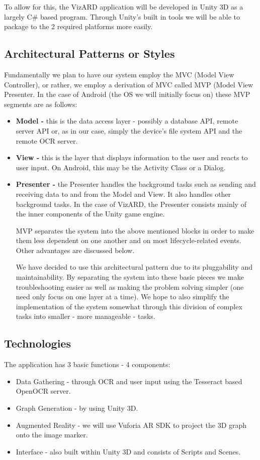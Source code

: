 \documentclass[a4paper,12pt]{article}
\begin{document}
To allow for this, the VizARD application will be developed in Unity 3D as a largely C\# based program. Through Unity's built in tools we will be able to package to the 2 required platforms more easily. 

\subsection{Architectural Patterns or Styles}
Fundamentally we plan to have our system employ the MVC (Model View Controller), or rather, we employ a derivation of MVC called MVP (Model View Presenter.
In the case of Android (the OS we will initially focus on) these MVP segments are as follows:
\begin{itemize}
	\item \textbf{Model -} this is the data access layer - possibly a database API, remote server API or, as in our case, simply the device's file system API and the remote OCR server.
	\item\textbf{View -} this is the layer that displays information to the user and reacts to user input. On Android, this may be the Activity Class or a Dialog.
	\item \textbf{Presenter -} the Presenter handles the background tasks such as sending and receiving data to and from the Model and View. It also handles other background tasks. In the case of VizARD, the Presenter consists mainly of the inner components of the Unity game engine.
	
MVP separates the system into the above mentioned blocks in order to make them less dependent on one another and on most lifecycle-related events. Other advantages are discussed below.

We have decided to use this architectural pattern due to its pluggability and maintainability. By separating the system into these basic pieces we make troubleshooting easier as well as making the problem solving simpler (one need only focus on one layer at a time). We hope to also simplify the implementation of the system somewhat through this division of complex tasks into smaller - more manageable - tasks.
\end{itemize}

\subsection{Technologies}
The application has 3 basic functions - 4 components:
\begin{itemize}
	\item Data Gathering - through OCR and user input using the Tesseract based OpenOCR server.
	\item Graph Generation - by using Unity 3D.
	\item Augmented Reality - we will use Vuforia AR SDK to project the 3D graph onto the image marker.
	\item Interface - also built within Unity 3D and consists of Scripts and Scenes.	
\end{itemize}
\end{document}
